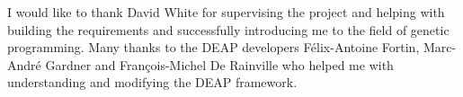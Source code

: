 I would like to thank David White for supervising the project and helping with building
the requirements and successfully introducing me to the field of genetic programming. Many 
thanks to the DEAP developers Félix-Antoine Fortin, Marc-André Gardner and François-Michel De Rainville
who helped me with understanding and modifying the DEAP framework.
